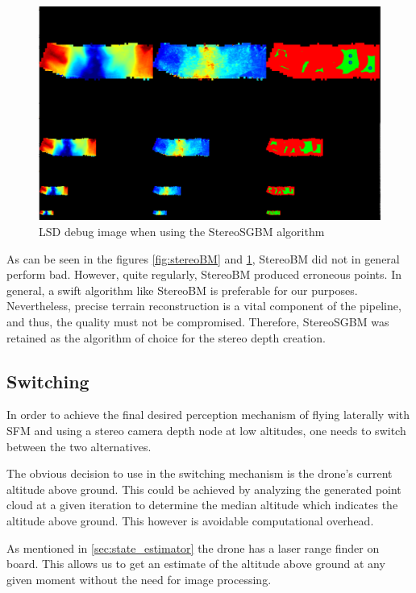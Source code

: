 \begin{figure}[h]
\centering
\includegraphics[scale=0.23]{images/stereo_camera_depth/stereoSGBM.png}
\caption{LSD debug image when using the StereoSGBM algorithm}
\label{fig:stereoSGBM}
\end{figure}

As can be seen in the figures \cref{fig:stereoBM} and \cref{fig:stereoSGBM}, StereoBM did not in general perform bad. However, quite regularly, StereoBM produced erroneous points. In general, a swift algorithm like StereoBM is preferable for our purposes. Nevertheless, precise terrain reconstruction is a vital component of the pipeline, and thus, the quality must not be compromised. Therefore, StereoSGBM was retained as the algorithm of choice for the stereo depth creation.
\clearpage %

\subsection{Switching}\label{subsec:switching}

In order to achieve the final desired perception mechanism of flying laterally with SFM and using a stereo camera depth node at low altitudes, one needs to switch between the two alternatives.

The obvious decision to use in the switching mechanism is the drone's current altitude above ground. This could be achieved by analyzing the generated point cloud at a given iteration to determine the median altitude which indicates the altitude above ground. This however is avoidable computational overhead.

As mentioned in \cref{sec:state_estimator} the drone has a laser range finder on board. This allows us to get an estimate of the altitude above ground at any given moment without the need for image processing.

